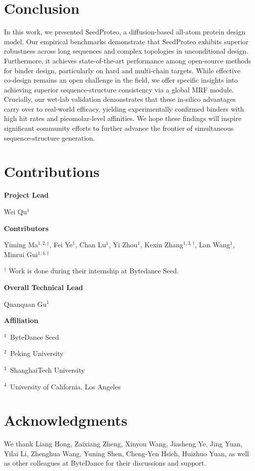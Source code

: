 \section{Conclusion}

In this work, we presented SeedProteo, a diffusion-based all-atom protein design model. Our empirical benchmarks demonstrate that SeedProteo exhibits superior robustness across long sequences and complex topologies in unconditional design. Furthermore, it achieves state-of-the-art performance among open-source methods for binder design, particularly on hard and multi-chain targets. While effective co-design remains an open challenge in the field, we offer specific insights into achieving superior sequence-structure consistency via a global MRF module. Crucially, our wet-lab validation demonstrates that these in-silico advantages carry over to real-world efficacy, yielding experimentally confirmed binders with high hit rates and picomolar-level affinities. We hope these findings will inspire significant community efforts to further advance the frontier of simultaneous sequence-structure generation.


\newpage



\newpage

\section*{Contributions}

\textbf{Project Lead}

Wei Qu$^{1}$


\textbf{Contributors}

Yiming Ma$^{1,2,\dagger}$, Fei Ye$^{1}$, Chan Lu$^{1}$, Yi Zhou$^{1}$, Kexin Zhang$^{1,3,\dagger}$, Lan Wang$^{1}$, Minrui Gui$^{1,4,\dagger}$

$^ \dagger$ Work is done during their internship at Bytedance Seed.

\textbf{Overall Technical Lead}

Quanquan Gu$^{1}$

\textbf{Affiliation}

$^1$~ByteDance Seed

$^2$~Peking University

$^3$~ShanghaiTech University

$^4$~University of California, Los Angeles

\section*{Acknowledgments}

We thank Liang Hong, Zaixiang Zheng, Xinyou Wang, Jiasheng Ye, Jing Yuan, Yilai Li, Zhenghua Wang, Yuning Shen, Cheng-Yen Hsieh, Huizhuo Yuan, as well as other colleagues at ByteDance for their discussions and support.